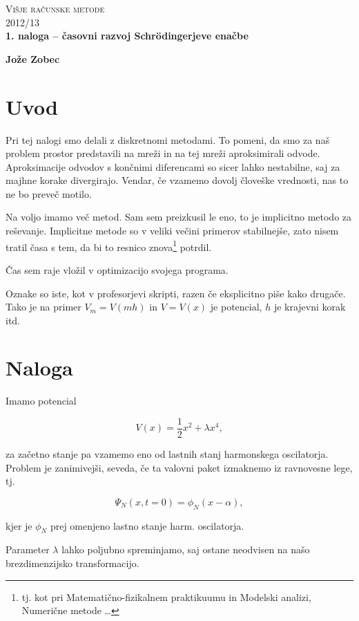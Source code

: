 \documentclass[a4 paper, 12pt]{article}
\begin{document}
\begin{center}
\textsc{Višje računske metode}\\
\textsc{2012/13}\\[0.5cm]
\textbf{1. naloga -- časovni razvoj Schr\" odingerjeve enačbe}
\end{center}
\begin{flushright}
\textbf{Jože Zobec}
\end{flushright}

\section{Uvod}

Pri tej nalogi smo delali z diskretnomi metodami. To pomeni, da smo za naš problem prostor
predstavili na mreži in na tej mreži aproksimirali odvode. Aproksimacije odvodov s končnimi
diferencami so sicer lahko nestabilne, saj za majhne korake divergirajo. Vendar, če vzamemo
dovolj človeške vrednosti, nas to ne bo preveč motilo.

Na voljo imamo več metod. Sam sem preizkusil le eno, to je implicitno metodo za reševanje.
Implicitne metode so v veliki večini primerov stabilnejše, zato nisem tratil časa s tem, da bi
to resnico znova\footnote{tj. kot pri Matematično-fizikalnem praktikuumu in Modelski analizi, Numerične metode \ldots}
potrdil.

Čas sem raje vložil v optimizacijo svojega programa.

Oznake so iste, kot v profesorjevi skripti, razen če eksplicitno piše kako drugače. Tako je
na primer $V_m = V(mh)$ in $V = V(x)$ je potencial, $h$ je krajevni korak itd.

\section{Naloga}

Imamo potencial

\begin{equation}
	V(x) = \frac{1}{2}x^2 + \lambda x^4,
\end{equation}

za začetno stanje pa vzamemo eno od lastnih stanj harmonskega oscilatorja. Problem je
zanimivejši, seveda, če ta valovni paket izmaknemo iz ravnovesne lege, tj.

\[
	\Psi_N (x, t = 0) = \phi_N (x - \alpha),
\]

kjer je $\phi_N$ prej omenjeno lastno stanje harm. oscilatorja.

Parameter $\lambda$
lahko poljubno spreminjamo, saj ostane neodvisen na našo brezdimenzijsko transformacijo.
\end{document}

